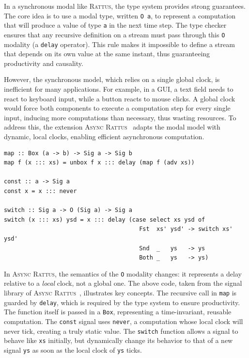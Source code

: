 In a synchronous modal \frp like \textsc{Rattus}, the type system provides strong guarantees. The
core idea is to use a modal type, written \texttt{O a}, to represent a computation that will produce
a value of type \texttt{a} in the next time step. The type checker ensures that any recursive
definition on a stream must pass through this \texttt{O} modality (\eg \via a \texttt{delay}
operator). This rule makes it impossible to define a stream that depends on its own value at the
same instant, thus guaranteeing productivity and causality.

However, the synchronous model, which relies on a single global clock, is inefficient for many
applications. For example, in a GUI, a text field needs to react to keyboard input, while a button
reacts to mouse clicks. A global clock would force both components to execute a computation step for
every single input, inducing more computations than necessary, thus wasting resources. To address
this, the extension \textsc{Async Rattus}~\cite{DBLP:journals/pacmpl/BahrM23} adapts the modal model
with dynamic, local clocks, enabling efficient asynchronous computation.

\begin{lstlisting}[basicstyle=\ttfamily\footnotesize\color{BlackText}]
map :: Box (a -> b) -> Sig a -> Sig b
map f (x ::: xs) = unbox f x ::: delay (map f (adv xs))

const :: a -> Sig a
const x = x ::: never

switch :: Sig a -> O (Sig a) -> Sig a
switch (x ::: xs) ysd = x ::: delay (case select xs ysd of
                                       Fst  xs' ysd' -> switch xs' ysd'
                                       Snd  _   ys   -> ys
                                       Both _   ys   -> ys)
\end{lstlisting}

In \textsc{Async Rattus}, the semantics of the \texttt{O} modality changes: it represents a delay
relative to a \emph{local} clock, not a global one. The above code, taken from the signal library of
\textsc{Async Rattus}~\cite{async_ratt}, illustrates key concepts. The recursive call in
\texttt{map} is guarded by \texttt{delay}, which is required by the type system to ensure
productivity. The function itself is passed in a \texttt{Box}, representing a time-invariant,
reusable computation. The \texttt{const} signal uses \texttt{never}, a computation whose local clock
will never tick, creating a truly static value. The \texttt{switch} function allows a signal to
behave like \texttt{xs} initially, but dynamically change its behavior to that of a new signal
\texttt{ys} as soon as the local clock of \texttt{ys} ticks.

